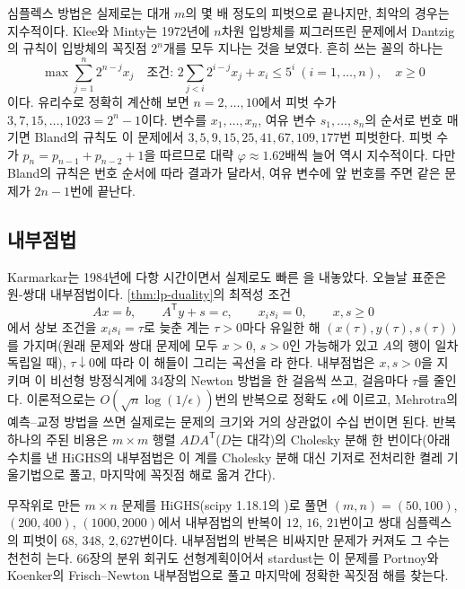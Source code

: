 심플렉스 방법은 실제로는 대개 $m$의 몇 배 정도의 피벗으로 끝나지만, 최악의 경우는 지수적이다. Klee와 Minty는 1972년에 $n$차원 입방체를 찌그러뜨린 문제에서 Dantzig의 규칙이 입방체의 꼭짓점 $2^n$개를 모두 지나는 것을 보였다\cite{klee1972}. 흔히 쓰는 꼴의 하나는
\[
\max\sum_{j=1}^n2^{n-j}x_j\quad\text{조건: }2\sum_{j<i}2^{i-j}x_j+x_i\le5^i\ (i=1,\dots,n),\quad x\ge0
\]
이다. 유리수로 정확히 계산해 보면 $n=2,\dots,10$에서 피벗 수가 $3,7,15,\dots,1023=2^n-1$이다. 변수를 $x_1,\dots,x_n$, 여유 변수 $s_1,\dots,s_n$의 순서로 번호 매기면 Bland의 규칙도 이 문제에서 $3,5,9,15,25,41,67,109,177$번 피벗한다. 피벗 수가 $p_n=p_{n-1}+p_{n-2}+1$을 따르므로 대략 $\varphi\approx1.62$배씩 늘어 역시 지수적이다. 다만 Bland의 규칙은 번호 순서에 따라 결과가 달라서, 여유 변수에 앞 번호를 주면 같은 문제가 $2n-1$번에 끝난다.

\subsection{내부점법}

Karmarkar는 1984년에 다항 시간이면서 실제로도 빠른 을 내놓았다\cite{karmarkar1984}. 오늘날 표준은 원-쌍대 내부점법이다\cite{wright1997pdipm}. \cref{thm:lp-duality}의 최적성 조건
\[
Ax=b,\qquad A^{\mathsf T}y+s=c,\qquad x_is_i=0,\qquad x,s\ge0
\]
에서 상보 조건을 $x_is_i=\tau$로 늦춘 계는 $\tau>0$마다 유일한 해 $(x(\tau),y(\tau),s(\tau))$를 가지며(원래 문제와 쌍대 문제에 모두 $x>0$, $s>0$인 가능해가 있고 $A$의 행이 일차 독립일 때), $\tau\downarrow0$에 따라 이 해들이 그리는 곡선을 라 한다. 내부점법은 $x,s>0$을 지키며 이 비선형 방정식계에 34장의 Newton 방법을 한 걸음씩 쓰고, 걸음마다 $\tau$를 줄인다. 이론적으로는 $O(\sqrt n\log(1/\epsilon))$번의 반복으로 정확도 $\epsilon$에 이르고, Mehrotra의 예측--교정 방법\cite{mehrotra1992}을 쓰면 실제로는 문제의 크기와 거의 상관없이 수십 번이면 된다. 반복 하나의 주된 비용은 $m\times m$ 행렬 $AD A^{\mathsf T}$($D$는 대각)의 Cholesky 분해 한 번이다(아래 수치를 낸 HiGHS의 내부점법은 이 계를 Cholesky 분해 대신 기저로 전처리한 켤레 기울기법으로 풀고, 마지막에 꼭짓점 해로 옮겨 간다).

무작위로 만든 $m\times n$ 문제를 HiGHS(scipy 1.18.1의 )로 풀면 $(m,n)=(50,100)$, $(200,400)$, $(1000,2000)$에서 내부점법의 반복이 $12$, $16$, $21$번이고 쌍대 심플렉스의 피벗이 $68$, $348$, $2{,}627$번이다. 내부점법의 반복은 비싸지만 문제가 커져도 그 수는 천천히 는다. 66장의 분위 회귀도 선형계획이어서 stardust는 이 문제를 Portnoy와 Koenker의 Frisch--Newton 내부점법으로 풀고\cite{portnoy1997} 마지막에 정확한 꼭짓점 해를 찾는다.

